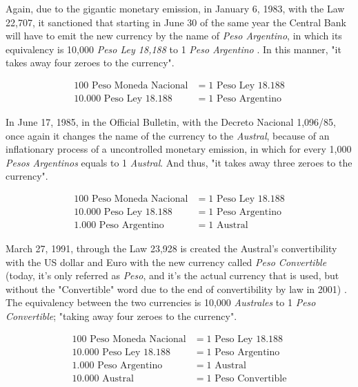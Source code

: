 \documentclass[12pt,a4paper,twoside]{book}
\begin{document}
Again, due to the gigantic monetary emission, in January 6, 1983, with the Law 22,707, it sanctioned that starting in June 30 of the same year the Central Bank will have to emit the new currency by the name of \textit{Peso Argentino}, in which its equivalency is 10,000 \textit{Peso Ley 18,188} to 1 \textit{Peso Argentino} \cite{dineroarg:pesarg}. In this manner, "it takes away four zeroes to the currency".

\begin{align*}
100 \text{ Peso Moneda Nacional} &= 1 \text{ Peso Ley 18.188} \\
10.000 \text{ Peso Ley 18.188} &= 1 \text{ Peso Argentino}
\end{align*}

In June 17, 1985, in the Official Bulletin, with the Decreto Nacional 1,096/85, once again it changes the name of the currency to the \textit{Austral}, because of an inflationary process of a uncontrolled monetary emission, in which for every 1,000 \textit{Pesos Argentinos} equals to 1 \textit{Austral}. And thus, "it takes away three zeroes to the currency".

\begin{align*}
100 \text{ Peso Moneda Nacional} &= 1 \text{ Peso Ley 18.188} \\
10.000 \text{ Peso Ley 18.188} &= 1 \text{ Peso Argentino} \\
1.000 \text{ Peso Argentino} &= 1 \text{ Austral}
\end{align*}

March 27, 1991, through the Law 23,928 is created the Austral's convertibility with the US dollar and Euro with the new currency called \textit{Peso Convertible} (today, it's only referred as \textit{Peso}, and it's the actual currency that is used, but without the "Convertible" word due to the end of convertibility by law in 2001) \cite{dineroarg:act}. The equivalency between the two currencies is 10,000 \textit{Australes} to 1 \textit{Peso Convertible}; "taking away four zeroes to the currency".

\begin{align*}
100 \text{ Peso Moneda Nacional} &= 1 \text{ Peso Ley 18.188} \\
10.000 \text{ Peso Ley 18.188} &= 1 \text{ Peso Argentino} \\
1.000 \text{ Peso Argentino} &= 1 \text{ Austral} \\
10.000 \text{ Austral} &= 1 \text{ Peso Convertible}
\end{align*}
\end{document}
